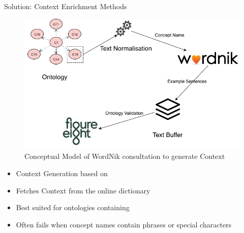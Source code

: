\documentclass[final,hyperref={pdfpagelabels=true}]{beamer}
\begin{document}
\begin{frame}
\begin{columns}[t, onlytextwidth]
\begin{column}{\textwidth}
\begin{column}{\textwidth}
\begin{block}{Solution: Context Enrichment Methods}
\begin{minipage}[c]{\textwidth}
\begin{minipage}[t]{.3\linewidth}
\begin{center}
						\end{center}
						\vspace{1cm}
						\begin{figure}[H]
							 \centering
							 \includegraphics[width=\textwidth]{figures/External_Source_Workflow}
							 \caption{Conceptual Model of WordNik consultation to generate Context}
						\end{figure}
						
						\vspace{-1cm}
						\hrulefill
						
						\begin{itemize}
							\small
							\justifying
							\setlength\itemsep{1cm}
							\item Context Generation based on {}
							\item Fetches Context from the online dictionary {}
							\item Best suited for ontologies containing {}
							\item Often fails when concept names contain phrases or special characters
						\end{itemize}
					\end{minipage}
					\hfill
					\hbox{}
				\end{minipage}
				\vspace{1cm}
			\end{block}
		\end{column}
		

\end{column}
\end{columns}
\end{frame}
\end{document}
